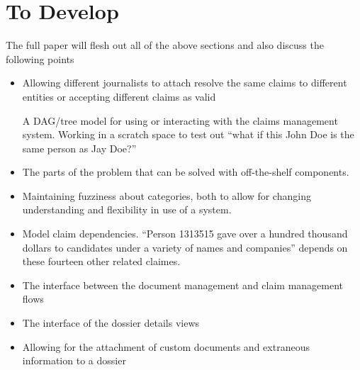 \documentclass[format=siggraph, review=true]{acmart}
\begin{document}
\section{To Develop}
The full paper will flesh out all of the above sections and also discuss
the following points

\begin{itemize}
  \item Allowing different journalists to attach resolve the same
    claims to different entities or accepting different claims as
    valid

    A DAG/tree model for using or interacting with the claims management system. Working in a scratch space to test out ``what if this John Doe is the same person as Jay Doe?''
  \item The parts of the problem that can be solved with off-the-shelf components.
  \item Maintaining fuzziness about categories, both to allow for changing understanding and flexibility in use of a system.
  \item Model claim dependencies. ``Person 1313515 gave over a hundred thousand dollars to candidates under a variety of names and companies'' depends on these fourteen other related claimes.
  \item The interface between the document management and claim
    management flows
  \item The interface of the dossier details views
  \item Allowing for the attachment of custom documents and extraneous
    information to a dossier
\end{itemize}
\end{document}

